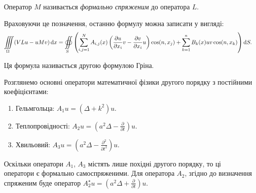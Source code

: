 \begin{definition}
    Оператор $M$ називається \textit{формально спряженим} до оператора $L$.
\end{definition}

Враховуючи це позначення, останню формулу можна записати у вигляді:
\begin{equation}
    \displaystyle\iiint\limits_\Omega (V L u - u M v) \mathop{}\!\mathrm{d} x = \displaystyle\oiint\limits_S \left( \displaystyle\sum\limits_{i, j = 1}^N A_{i, j}(x) \left( \frac{\partial u}{\partial x_i} v - \frac{\partial v}{\partial x_i} u \right) \cos(n, x_j) + \displaystyle\sum\limits_{k = 1}^n B_k(x) u v \cos(n, x_k) \right) \mathop{}\!\mathrm{d} S.
\end{equation}

\begin{definition}
    Ця формула називається другою формулою Гріна. 
\end{definition}

Розглянемо основні оператори математичної фізики другого порядку з постійними коефіцієнтами:
\begin{enumerate}
    \item Гельмгольца: $A_1 u = (\Delta + k^2) u$.
    \item Теплопровідності: $A_2 u = \left( a^2 \Delta - \frac{\partial}{\partial t} \right) u$.
    \item Хвильовий: $A_3 u = \left( a^2 \Delta - \frac{\partial^2}{\partial t^2} \right) u$.
\end{enumerate}

Оскільки оператори $A_1$, $A_3$ містять лише похідні другого порядку, то ці оператори є формально самоспряженими. Для оператора $A_2$, згідно до визначення спряженим буде оператор $A_2^\star u = \left( a^2 \Delta + \frac{\partial}{\partial t} \right) u$. \medskip

